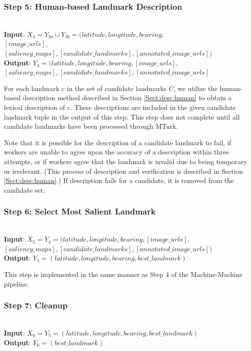 \subsubsection*{Step 5: Human-based Landmark Description}~\\
\noindent\textbf{Input}: $X_4 = Y_{3a} \cup Y_{3b} = (latitude, longitude, bearing, $\\$[image\_urls], $\\$[saliency\_maps], [candidate\_landmarks], [annotated\_image\_urls])$ \\
\textbf{Output}: $Y_4 = (latitude, longitude, bearing, [image\_urls],$\\$ [saliency\_maps], [candidate\_landmarks], [annotated\_image\_urls]$ 

For each landmark $c$ in the set of candidate landmarks $C$, we utilize the human-based description method described in Section \ref{Sect:desc:human} to obtain a lexical description of $c$. These descriptions are included in the given candidate landmark tuple in the output of this step. This step does not complete until all candidate landmarks have been processed through MTurk.

Note that it is possible for the description of a candidate landmark to fail, if workers are unable to agree upon the accuracy of a description within three attempts, or if workers agree that the landmark is invalid due to being temporary or irrelevant. (This process of description and verification is described in Section \ref{Sect:desc:human}.) If description fails for a candidate, it is removed from the candidate set.

\subsubsection*{Step 6: Select Most Salient Landmark}~\\
\noindent\textbf{Input}: $X_5 = Y_4 = (latitude, longitude, bearing,  [image\_urls], $\\$[saliency\_maps], [candidate\_landmarks], [annotated\_image\_urls] )$\\
\textbf{Output}: $Y_5 = (latitude, longitude, bearing, best\_landmark)$
 
This step is implemented in the same manner as Step 4 of the Machine-Machine pipeline.

\subsubsection*{Step 7: Cleanup}~\\
\noindent\textbf{Input}: $X_6 = Y_5 = (latitude, longitude, bearing, best\_landmark)$\\
\textbf{Output}: $Y_6 = (best\_landmark)$

